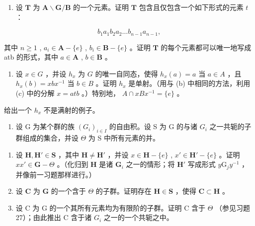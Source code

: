 \begin{enumerate}
\def\labelenumi{(\alph{enumi})}
\setcounter{enumi}{2}
\tightlist
\item
  设 \(\mathbf{T}\) 为 \(\mathbf{A} \backslash \mathbf{G} / \mathbf{B}\) 的一个元素。证明 \(\mathbf{T}\) 包含且仅包含一个如下形式的元素 \(t\) ：
\end{enumerate}

\[
b _ {1} a _ {1} b _ {2} a _ {2} \dots b _ {n - 1} a _ {n - 1},
\]

其中 \(n \geqslant 1\) , \(a_i \in \mathbf{A} - \{e\}\) , \(b_i \in \mathbf{B} - \{e\}\) 。证明 \(\mathbf{T}\) 的每个元素都可以唯一地写成 atb 的形式，其中 \(a \in \mathbf{A}\) , \(b \in \mathbf{B}\) 。

\begin{enumerate}
\def\labelenumi{(\alph{enumi})}
\setcounter{enumi}{3}
\tightlist
\item
  设 \(x \in G\) ，并设 \(h_x\) 为 \(G\) 的唯一自同态，使得 \(h_x(a) = a\) 当 \(a \in A\) ，且 \(h_x(b) = x b x^{-1}\) 当 \(b \in B\) 。证明 \(h_x\) 是单射。（用与 (b) 中相同的方法，利用 (c) 中的分解 \(x = a t b\) 。）特别地， \(A \cap x B x^{-1} = \{e\}\) 。
\end{enumerate}

给出一个 \(h_{x}\) 不是满射的例子。

\begin{enumerate}
\def\labelenumi{\arabic{enumi}.}
\setcounter{enumi}{30}
\tightlist
\item
  设 G 为某个群的族 \((G_{i})_{i\in I}\) 的自由积。设 S 为 G 的与诸 \(G_{i}\) 之一共轭的子群组成的集合，并设 \(\Theta\) 为 S 中所有元素的并。
\end{enumerate}

\begin{enumerate}
\def\labelenumi{(\alph{enumi})}
\item
  设 \(\mathbf{H}, \mathbf{H}' \in \mathbf{S}\) ，其中 \(\mathbf{H} \neq \mathbf{H}'\) ，并设 \(x \in \mathbf{H} - \{e\}\) , \(x' \in \mathbf{H}' - \{e\}\) 。证明 \(xx' \in \mathbf{G} - \Theta\) 。（化归到 \(\mathbf{H}\) 是诸 \(\mathbf{G}_i\) 之一的情形；将 \(\mathbf{H}'\) 写成形式 \(y\mathrm{G}_j y^{-1}\) ，并像前一习题那样进行。）
\item
  设 \(\mathbf{C}\) 为 \(\mathbf{G}\) 的一个含于 \(\Theta\) 的子群。证明存在 \(\mathbf{H} \in \mathbf{S}\) ，使得 \(\mathbf{C} \subset \mathbf{H}\) 。
\item
  设 C 为 G 的一个其所有元素均为有限阶的子群。证明 C 含于 \(\Theta\) （参见习题 27）；由此推出 C 含于诸 \(G_{i}\) 之一的一个共轭之中。
\end{enumerate}

